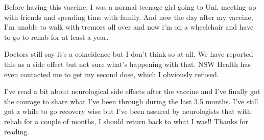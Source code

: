 {Before having this vaccine, I was a normal teenage girl going to Uni, meeting up
with friends and spending time with family. And now the day after my vaccine,
I’m unable to walk with tremors all over and now i’m on a wheelchair and have to
go to rehab for at least a year.

Doctors still say it’s a coincidence but I don’t think so at all. We have
reported this as a side effect but not sure what’s happening with that. NSW
Health has even contacted me to get my second dose, which I obviously
refused.

I’ve read a bit about neurological side effects after the vaccine and I’ve
finally got the courage to share what I’ve been through during the last 3.5
months. I’ve still got a while to go recovery wise but I’ve been assured by
neurologists that with rehab for a couple of months, I should return back to
what I was!! Thanks for reading.

}
